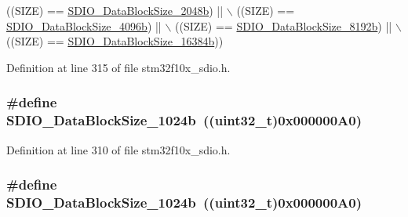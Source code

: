 \begin{DoxyCode}
                                  ((SIZE) == \hyperlink{group___s_d_i_o___data___block___size_ga41eb937621c7ffcf2688c6bc0ea31464}{SDIO\_DataBlockSize\_2048b}) || \(\backslash\)
                                  ((SIZE) == \hyperlink{group___s_d_i_o___data___block___size_ga360411488abdbaf9eee9b99fca793f79}{SDIO\_DataBlockSize\_4096b}) || \(\backslash\)
                                  ((SIZE) == \hyperlink{group___s_d_i_o___data___block___size_gaf61913f3eff52c0f728db9ffbdaca7d2}{SDIO\_DataBlockSize\_8192b}) || \(\backslash\)
                                  ((SIZE) == \hyperlink{group___s_d_i_o___data___block___size_gae80bc49dbed677f7087d523c31fe10ae}{SDIO\_DataBlockSize\_16384b}))
\end{DoxyCode}


Definition at line 315 of file stm32f10x\+\_\+sdio.\+h.

\subsubsection[{\texorpdfstring{S\+D\+I\+O\+\_\+\+Data\+Block\+Size\+\_\+1024b}{SDIO_DataBlockSize_1024b}}]{\setlength{\rightskip}{0pt plus 5cm}\#define S\+D\+I\+O\+\_\+\+Data\+Block\+Size\+\_\+1024b~(({\bf uint32\+\_\+t})0x000000\+A0)}\hypertarget{group___s_d_i_o___data___block___size_ga7dad3c1c33e63a00eb6301b0a1135baf}{}\label{group___s_d_i_o___data___block___size_ga7dad3c1c33e63a00eb6301b0a1135baf}


Definition at line 310 of file stm32f10x\+\_\+sdio.\+h.

\subsubsection[{\texorpdfstring{S\+D\+I\+O\+\_\+\+Data\+Block\+Size\+\_\+1024b}{SDIO_DataBlockSize_1024b}}]{\setlength{\rightskip}{0pt plus 5cm}\#define S\+D\+I\+O\+\_\+\+Data\+Block\+Size\+\_\+1024b~(({\bf uint32\+\_\+t})0x000000\+A0)}\hypertarget{group___s_d_i_o___data___block___size_ga7dad3c1c33e63a00eb6301b0a1135baf}{}\label{group___s_d_i_o___data___block___size_ga7dad3c1c33e63a00eb6301b0a1135baf}


